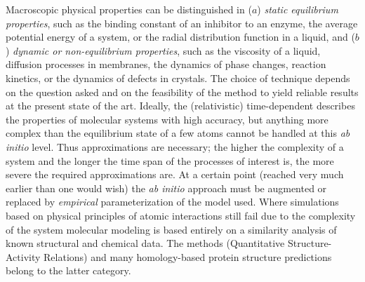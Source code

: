 Macroscopic physical properties can be distinguished in ($a$) {\em static 
equilibrium properties}, such as the binding constant  of an inhibitor to an 
enzyme, the average potential energy of a system, or the radial distribution  
function in a liquid, and ($b$) {\em
dynamic or non-equilibrium properties}, such as the viscosity of a 
liquid, diffusion processes in membranes, the dynamics of phase 
changes, reaction kinetics, or the dynamics of defects in crystals.  
The choice of technique depends on the question asked and on the 
feasibility of the method to yield reliable results at the present 
state of the art. Ideally, the (relativistic) time-dependent 
describes the properties of molecular systems 
with high accuracy, but anything more complex than the equilibrium 
state of a few atoms cannot be handled at this {\em ab initio} level. 
Thus approximations are necessary; the higher the complexity of a 
system and the longer the time span of the processes of interest is, 
the more severe the required approximations are. At a certain point 
(reached very much earlier than one would wish) the {\em ab initio} 
approach must be augmented or replaced by {\em empirical} 
parameterization of the model used. Where simulations based on physical 
principles of atomic interactions still fail  due to the complexity of the 
system 
molecular modeling is based entirely on a similarity analysis of known 
structural and chemical data. The  methods (Quantitative 
Structure-Activity Relations) and many homology-based protein structure  
predictions belong to the latter category.

